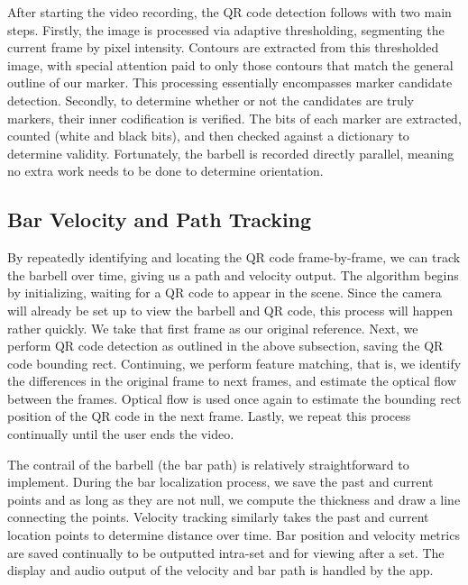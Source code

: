 \documentclass[10pt,twocolumn]{article}
\begin{document}
After starting the video recording, the QR code detection follows with two main steps.
Firstly, the image is processed via adaptive thresholding, segmenting the current frame by pixel intensity.
Contours are extracted from this thresholded image, with special attention paid to only those contours that match the general outline of our marker.
This processing essentially encompasses marker candidate detection.
Secondly, to determine whether or not the candidates are truly markers, their inner codification is verified.
The bits of each marker are extracted, counted (white and black bits), and then checked against a dictionary to determine validity.
Fortunately, the barbell is recorded directly parallel, meaning no extra work needs to be done to determine orientation. \par

\subsection{Bar Velocity and Path Tracking}
By repeatedly identifying and locating the QR code frame-by-frame, we can track the barbell over time, giving us a path and velocity output. 
The algorithm begins by initializing, waiting for a QR code to appear in the scene.
Since the camera will already be set up to view the barbell and QR code, this process will happen rather quickly.
We take that first frame as our original reference.
Next, we perform QR code detection as outlined in the above subsection, saving the QR code bounding rect.
Continuing, we perform feature matching, that is, we identify the differences in the original frame to next frames, and estimate the optical flow between the frames.
Optical flow is used once again to estimate the bounding rect position of the QR code in the next frame.
Lastly, we repeat this process continually until the user ends the video. \par

The contrail of the barbell (the bar path) is relatively straightforward to implement.
During the bar localization process, we save the past and current points and as long as they are not null, we compute the thickness and draw a line connecting the points.
Velocity tracking similarly takes the past and current location points to determine distance over time.
Bar position and velocity metrics are saved continually to be outputted intra-set and for viewing after a set.
The display and audio output of the velocity and bar path is handled by the app. \par
\end{document}
